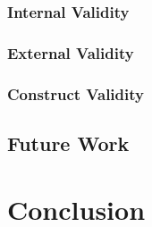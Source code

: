 \subsubsection{Internal Validity}

\subsubsection{External Validity}

\subsubsection{Construct Validity}

\subsection{Future Work}

\section{Conclusion}

\printbibliography

